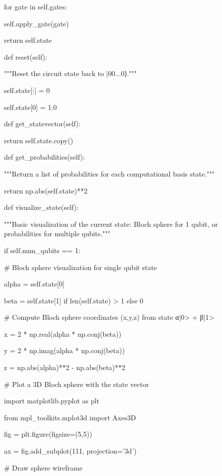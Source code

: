 \documentclass[%
oneside,                 %
final,                   %
10pt]{article}
\begin{document}
        for gate in self.gates:

            self.apply_gate(gate)

        return self.state



    def reset(self):

        """Reset the circuit state back to |00...0⟩."""

        self.state[:] = 0

        self.state[0] = 1.0



    def get_statevector(self):

        return self.state.copy()



    def get_probabilities(self):

        """Return a list of probabilities for each computational basis state."""

        return np.abs(self.state)**2



    def visualize_state(self):

        """Basic visualization of the current state: Bloch sphere for 1 qubit, or probabilities for multiple qubits."""

        if self.num_qubits == 1:

            # Bloch sphere visualization for single qubit state

            alpha = self.state[0]

            beta = self.state[1] if len(self.state) > 1 else 0

            # Compute Bloch sphere coordinates (x,y,z) from state α|0> + β|1>

            x = 2 * np.real(alpha * np.conj(beta))

            y = 2 * np.imag(alpha * np.conj(beta))

            z = np.abs(alpha)**2 - np.abs(beta)**2

            # Plot a 3D Bloch sphere with the state vector

            import matplotlib.pyplot as plt

            from mpl_toolkits.mplot3d import Axes3D

            fig = plt.figure(figsize=(5,5))

            ax = fig.add_subplot(111, projection='3d')

            # Draw sphere wireframe
\end{document}

